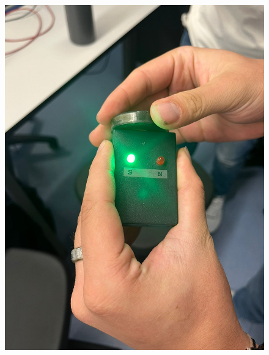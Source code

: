 \begin{figure}[H]
\begin{minipage}{0.3\textwidth}
    \includegraphics[width=\textwidth]{Figures/1. Content/BuscarPolaridad1.jpeg}
    \label{fig: Polaridad Positiva del Iman 2}
  \end{minipage}
  \hfill
  \begin{minipage}{0.3\textwidth}
    \centering

\end{minipage}
\end{figure}
